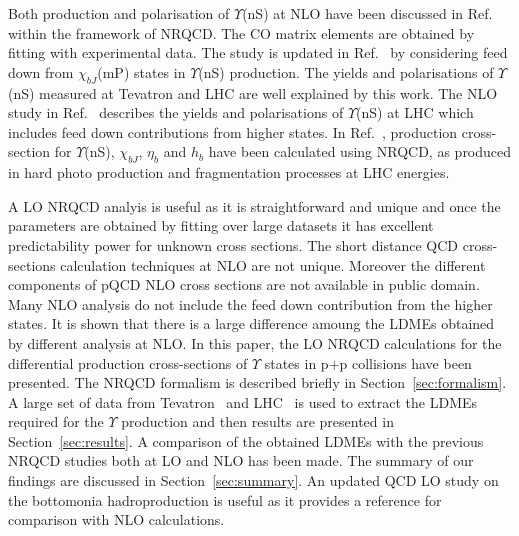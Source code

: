 \documentclass[review]{elsarticle}
\begin{document}
Both production and polarisation of $\Upsilon$(nS) at NLO have been discussed in 
Ref.~\cite{Gong:2013qka} within the framework of NRQCD. The CO matrix elements are obtained
by fitting with experimental data. The study is updated in Ref.~\cite{Feng:2015wka} by considering
feed down from $\chi_{bJ}$(mP) states in $\Upsilon$(nS) production. The yields and
polarisations of $\Upsilon$(nS) measured at Tevatron and LHC are well explained by this work.
The NLO study in Ref.~\cite{Han:2014kxa} describes the yields and polarisations of
$\Upsilon$(nS) at LHC which includes feed down contributions from
higher states. In Ref.~\cite{Yu:2017pot}, production cross-section for $\Upsilon$(nS),
$\chi_{bJ}$, $\eta_b$ and $h_b$ have been calculated using NRQCD, as produced in hard
photo production and fragmentation processes at LHC energies. 

A LO NRQCD analyis is useful as it is straightforward and unique and once the parameters are
obtained by fitting over large datasets it has excellent predictability power for unknown cross
sections. The short distance QCD cross-sections calculation techniques at NLO are not unique.
Moreover the different components of pQCD NLO cross sections are not available in
public domain. Many NLO analysis do not include the feed down contribution from the higher
states. It is shown that there is a large difference amoung the LDMEs obtained by different
analysis at NLO. In this paper, the LO NRQCD calculations for the differential production
cross-sections of $\Upsilon$ states in p+p collisions have been presented.
The NRQCD formalism is described
briefly in Section~\ref{sec:formalism}. 
A large set of data from Tevatron~\cite{Acosta:2001gv} and
LHC~\cite{LHCb:2012aa,Khachatryan:2015qpa,Aad:2012dlq,Chatrchyan:2013yna,Sirunyan:2017qdw} 
is used to extract the LDMEs required for the $\Upsilon$ production and then results are
presented in Section~\ref{sec:results}. A comparison of the obtained LDMEs with the
previous NRQCD studies both at LO and NLO has been made. The summary 
of our findings are discussed in Section~\ref{sec:summary}. An updated QCD LO study on the
bottomonia hadroproduction is useful as it provides a reference for comparison
with NLO calculations. 
\end{document}
